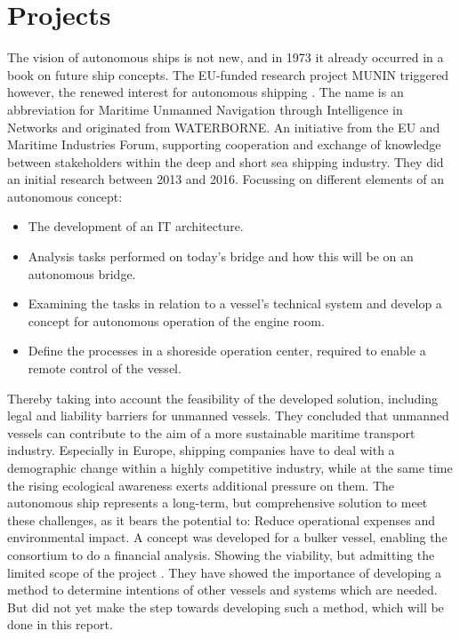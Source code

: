 \section{Projects}
The vision of autonomous ships is not new, and in 1973 it already occurred in a book on future ship concepts. The EU-funded research project MUNIN triggered however, the renewed interest for autonomous shipping \cite{Saarni2018}. The name is an abbreviation for Maritime Unmanned Navigation through Intelligence in Networks and originated from WATERBORNE. An initiative from the EU and Maritime Industries Forum, supporting cooperation and exchange of knowledge between stakeholders within the deep and short sea shipping industry. They did an initial research between 2013 and 2016. Focussing on different elements of an autonomous concept: 
\begin{itemize}
	\item The development of an IT architecture. 
	\item Analysis tasks performed on today's bridge and how this will be on an autonomous bridge. 
	\item Examining the tasks in relation to a vessel’s technical system and develop a concept for autonomous operation of the engine room. 
	\item Define the processes in a shoreside operation center, required to enable a remote control of the vessel. 
\end{itemize}
Thereby taking into account the feasibility of the developed solution, including legal and liability barriers for unmanned vessels.
They concluded that unmanned vessels can contribute to the aim of a more sustainable maritime transport industry. Especially in Europe, shipping companies have to deal with a demographic change within a highly competitive industry, while at the same time the rising ecological awareness exerts additional pressure on them. The autonomous ship represents a long-term, but comprehensive solution to meet these challenges, as it bears the potential to: Reduce operational expenses and environmental impact.
A concept was developed for a bulker vessel, enabling the consortium to do a financial analysis. Showing the viability, but admitting the limited scope of the project \cite{MUNIN2016}. They have showed the importance of developing a method to determine intentions of other vessels and systems which are needed. But did not yet make the step towards developing such a method, which will be done in this report.

